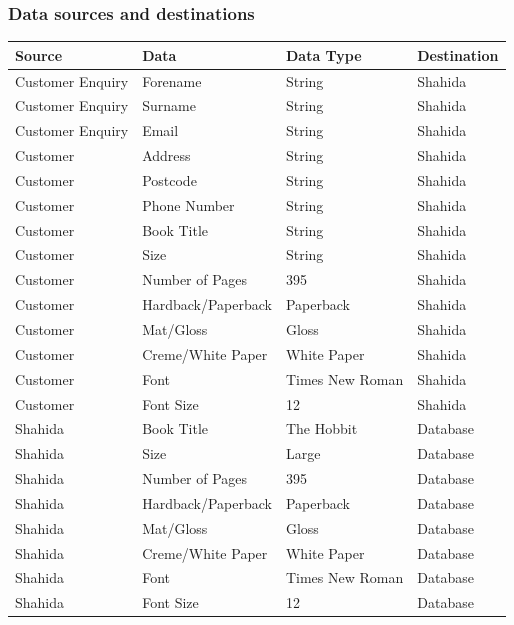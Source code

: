 \subsubsection{Data sources and destinations}
\begin{center}
\begin{tabular}{|p{3cm}|p{3cm}|p{2cm}|p{2cm}|}
    \hline
    \textbf{Source} & \textbf{Data} & \textbf{Data Type} & \textbf{Destination} \\ \hline
    Customer Enquiry & Forename & String & Shahida  \\ \hline
    Customer Enquiry & Surname & String & Shahida  \\ \hline
    Customer Enquiry & Email & String & Shahida  \\ \hline
    Customer & Address & String & Shahida  \\ \hline
    Customer & Postcode & String & Shahida  \\ \hline
    Customer & Phone Number & String & Shahida  \\ \hline
    Customer & Book Title & String & Shahida \\  \hline
    Customer & Size & String & Shahida \\  \hline
    Customer & Number of Pages & 395 & Shahida \\  \hline
    Customer & Hardback/Paperback & Paperback & Shahida \\  \hline
    Customer & Mat/Gloss & Gloss & Shahida \\  \hline
    Customer & Creme/White Paper & White Paper & Shahida \\  \hline
    Customer & Font & Times New Roman & Shahida \\  \hline
    Customer & Font Size & 12 & Shahida \\  \hline
    Shahida & Book Title & The Hobbit & Database \\  \hline
    Shahida & Size & Large & Database \\  \hline
    Shahida & Number of Pages & 395 & Database \\  \hline
    Shahida & Hardback/Paperback & Paperback & Database \\  \hline
    Shahida & Mat/Gloss & Gloss & Database \\  \hline
    Shahida & Creme/White Paper & White Paper & Database \\  \hline
    Shahida & Font & Times New Roman & Database \\  \hline
    Shahida & Font Size & 12 & Database \\  \hline

\end{tabular}
\end{center}
